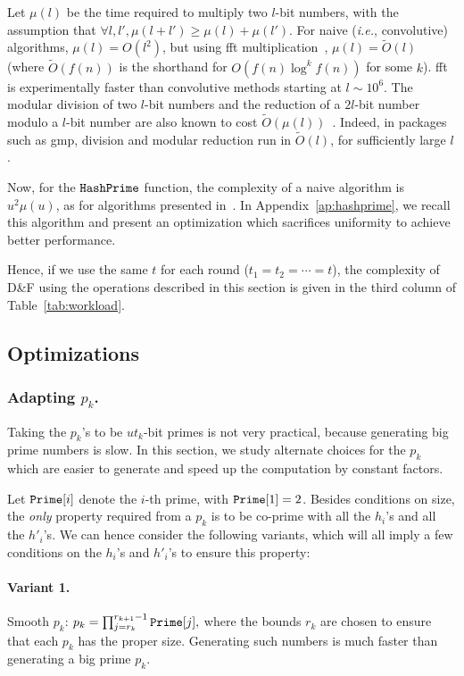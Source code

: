 \documentclass[twoside,envcountsame,runningheads]{llncs}
\newcommand{\Oapp}{\ensuremath{\tilde{O}}}
\newcommand{\df}{D\&F\xspace}
\newcommand{\ie}{\textit{i.e.}\xspace}
\newcommand{\apref}[1]{Appendix~\ref{#1}}
\newcommand{\apref}[1]{the full version~\cite{X:ABBMNR13}}
\begin{document}
Let $\mu(l)$ be the time required to multiply two $l$-bit numbers, with the assumption that $\forall l,l', \mu(l+l') \ge \mu(l) + \mu(l')$.
For naive (\ie, convolutive) algorithms, $\mu(l) = O(l^2)$, but using {\sc fft} multiplication~\cite{schonhage1971schnelle}, $\mu(l) = \Oapp(l)$ (where $\Oapp(f(n))$ is the shorthand for $O(f(n) \log^k f(n))$ for some $k$). {\sc fft} is experimentally faster than convolutive methods starting at $l \sim 10^6$.
The modular division of two $l$-bit numbers and the reduction of a $2l$-bit number modulo a $l$-bit number are also known to cost $\Oapp(\mu(l))$~\cite{burnikel1998fast}.
Indeed, in packages such as {\sf gmp}, division and modular reduction run in $\Oapp(l)$, for sufficiently large $l$.

Now, for the $\tt HashPrime$ function, the complexity of a naive algorithm is $u^2 \mu(u)$, as for algorithms presented in~\cite{C:HohWat09,PKC:AbdBenPoi13}.
In \apref{ap:hashprime}, we recall this algorithm and present an optimization which sacrifices uniformity to achieve better performance.

Hence, if we use the same $t$ for each round ($t_1=t_2=\cdots=t$), the complexity of \df using the operations described in this section is given in the third column of Table~\ref{tab:workload}.

\subsection{Optimizations}
\label{sec:optims}

\subsubsection{Adapting $p_k$.}
\label{sec:choicep}

Taking the $p_k$'s to be $ut_k$-bit primes is not very practical, because generating big prime numbers is slow. In this section, we study alternate choices for the $p_k$ which are easier to generate and speed up the computation by constant factors.

Let $\mbox{{\tt Prime}}[i]$ denote the $i$-th prime, with $\mbox{{\tt Prime}}[1]=2$. Besides conditions on size, the \textit{only} property required from a $p_k$ is to be co-prime with all the $h_i$'s and all the $h'_i$'s. We can hence consider the following variants, which will all imply a few conditions on the $h_i$'s and $h'_i$'s to ensure this property:
\paragraph{Variant 1.} Smooth $p_k$:
$ p_k=\prod_{j=r_k}^{r_{k+1}-1} \mbox{{\tt Prime}}[j], $
where the bounds $r_k$ are chosen to ensure that each $p_k$ has the proper size.
Generating such numbers is much faster than generating a big prime $p_k$.
\end{document}
